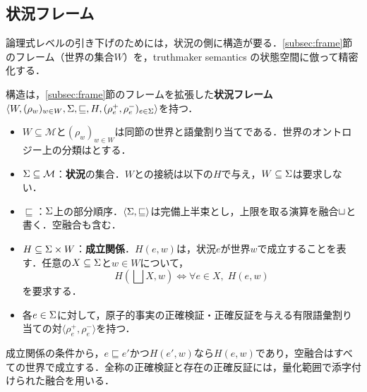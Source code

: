\documentclass[../../main-detail.tex]{subfiles}
\begin{document}
\subsection{状況フレーム}\label{subsec:situation-frame}
論理式レベルの引き下げのためには，状況の側に構造が要る．\ref{subsec:frame}節のフレーム（世界の集合$W$）を，truthmaker semantics \cite{fine-tms} の状態空間に倣って精密化する．
\begin{definition}[状況フレーム]
    構造は，\ref{subsec:frame}節のフレームを拡張した\textbf{状況フレーム}
    $\langle W,(\rho_w)_{w\in W},\Sigma,\sqsubseteq,H,(\rho_e^+,\rho_e^-)_{e\in\Sigma}\rangle$を持つ．
    \begin{itemize}
        \item $W\subseteq\mathcal M$と$(\rho_w)_{w\in W}$は同節の世界と語彙割り当てである．世界のオントロジー上の分類はとする．
        \item $\Sigma\subseteq\mathcal M$：\textbf{状況}の集合．$W$との接続は以下の$H$で与え，$W\subseteq\Sigma$は要求しない．
        \item $\sqsubseteq$：$\Sigma$上の部分順序．$\langle\Sigma,\sqsubseteq\rangle$は完備上半束とし，上限を取る演算を融合$\sqcup$と書く．空融合も含む．
        \item $H\subseteq\Sigma\times W$：\textbf{成立関係}．$H(e,w)$は，状況$e$が世界$w$で成立することを表す．任意の$X\subseteq\Sigma$と$w\in W$について，
        \[
            H\left(\bigsqcup X,w\right)\iff\forall e\in X,\;H(e,w)
        \]
        を要求する．
        \item 各$e\in\Sigma$に対して，原子的事実の正確検証・正確反証を与える有限語彙割り当ての対$\langle\rho_e^+,\rho_e^-\rangle$を持つ．
    \end{itemize}
\end{definition}
\begin{remark}
    成立関係の条件から，$e\sqsubseteq e'$かつ$H(e',w)$なら$H(e,w)$であり，空融合はすべての世界で成立する．全称の正確検証と存在の正確反証には，量化範囲で添字付けられた融合を用いる．
\end{remark}
\end{document}
